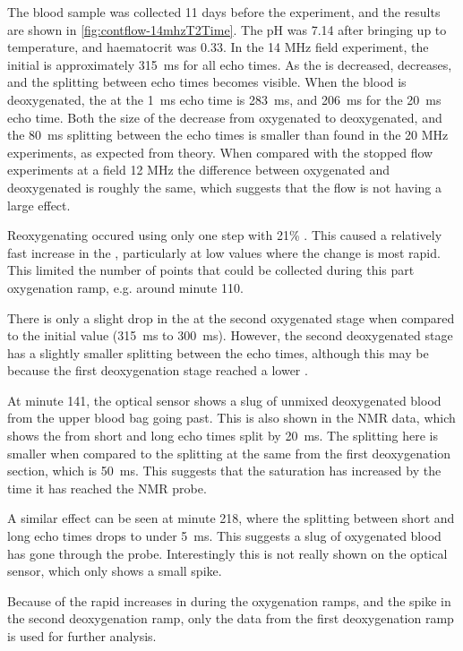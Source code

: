 The blood sample was collected 11 days before the experiment, and the results are shown in \autoref{fig:contflow-14mhzT2Time}.
The pH was 7.14 after bringing up to temperature, and haematocrit was 0.33.
In the 14 MHz field experiment, the initial \Ttwo is approximately \SI{315}{ms} for all echo times.
As the \SOtwo is decreased, \Ttwo decreases, and the splitting between echo times becomes visible.
When the blood is deoxygenated, the \Ttwo at the \SI{1}{ms} echo time is \SI{283}{ms}, and \SI{206}{ms} for the \SI{20}{ms} echo time.
Both the size of the decrease from  oxygenated to deoxygenated, and the \SI{80}{ms} splitting between the echo times is smaller than found in the 20 MHz experiments, as expected from theory.
When compared with the stopped flow experiments at a field 12 MHz the difference between oxygenated and deoxygenated is roughly the same, which suggests that the flow is not having a large effect.

Reoxygenating occured using only one step with 21\% \Otwo.
This caused a relatively fast increase in the \SOtwo, particularly at low \SOtwo values where the \Ttwo change is most rapid.
This limited the number of points that could be collected during this part oxygenation ramp, e.g. around minute 110.

There is only a slight drop in the \Ttwo at the second oxygenated stage when compared to the initial value (\SI{315}{ms} to \SI{300}{ms}).
However, the second deoxygenated stage has a slightly smaller splitting between the echo times, although this may be because the first deoxygenation stage reached a lower \SOtwo.

At minute 141, the optical sensor shows a slug of unmixed deoxygenated blood from the upper blood bag going past.
This is also shown in the NMR data, which shows the \Ttwo from short and long echo times split by \SI{20}{ms}.
The splitting here is smaller when compared to the splitting at the same \SOtwo from the first deoxygenation section, which is \SI{50}{ms}.
This suggests that the saturation has increased by the time it has reached the NMR probe.

A similar effect can be seen at minute 218, where the splitting between short and long echo times drops to under \SI{5}{ms}.
This suggests a slug of oxygenated blood has gone through the probe.
Interestingly this is not really shown on the optical sensor, which only shows a small spike.

Because of the rapid increases in \Ttwo during the oxygenation ramps, and the \Ttwo spike in the second deoxygenation ramp, only the data from the first deoxygenation ramp is used for further analysis.



